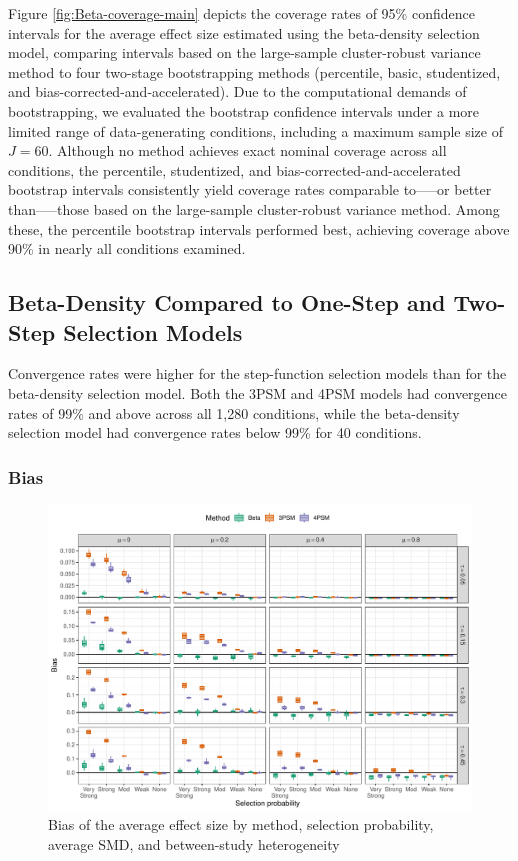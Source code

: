 \documentclass[
  american,
  man, donotrepeattitle,floatsintext]{apa7}
\begin{document}
Figure \ref{fig:Beta-coverage-main} depicts the coverage rates of 95\% confidence intervals for the average effect size estimated using the beta-density selection model, comparing intervals based on the large-sample cluster-robust variance method to four two-stage bootstrapping methods (percentile, basic, studentized, and bias-corrected-and-accelerated). Due to the computational demands of bootstrapping, we evaluated the bootstrap confidence intervals under a more limited range of data-generating conditions, including a maximum sample size of \(J = 60\). Although no method achieves exact nominal coverage across all conditions, the percentile, studentized, and bias-corrected-and-accelerated bootstrap intervals consistently yield coverage rates comparable to-----or better than-----those based on the large-sample cluster-robust variance method. Among these, the percentile bootstrap intervals performed best, achieving coverage above 90\% in nearly all conditions examined.

\subsection{Beta-Density Compared to One-Step and Two-Step Selection Models}\label{beta-density-compared-to-one-step-and-two-step-selection-models}

Convergence rates were higher for the step-function selection models than for the beta-density selection model. Both the 3PSM and 4PSM models had convergence rates of 99\% and above across all 1,280 conditions, while the beta-density selection model had convergence rates below 99\% for 40 conditions.

\subsubsection{Bias}\label{bias-1}

\begin{figure}
\includegraphics{beta-function-selection-models-with-dependent-effects_files/figure-latex/mu-bias-miss-1} \caption{Bias of the average effect size by method, selection probability, average SMD, and between-study heterogeneity}\label{fig:mu-bias-miss}
\end{figure}
\end{document}

